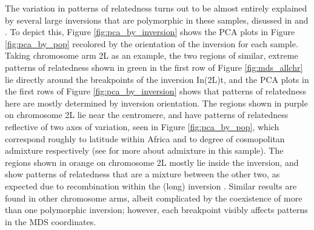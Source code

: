 \documentclass[11pt, oneside]{article}   	%
\begin{document}
The variation in patterns of relatedness turns out to be almost entirely explained by
several large inversions that are polymorphic in these samples, 
disussed in \citet{corbett2012population} and \citet{langley2012genomic}.
To depict this, Figure \ref{fig:pca_by_inversion} shows
the PCA plots in Figure \ref{fig:pca_by_pop} recolored by the orientation of the inversion for each sample.
Taking chromosome arm 2L as an example,
the two regions of similar, extreme patterns of relatedness
shown in green in the first row of Figure \ref{fig:mds_allchr}
lie directly around the breakpoints of the inversion In(2L)t,
and the PCA plots in the first rows of Figure \ref{fig:pca_by_inversion}
shows that patterns of relatedness here are mostly determined by inversion orientation.
The regions shown in purple on chromosome 2L lie near the centromere,
and have patterns of relatedness reflective of two axes of variation,
seen in Figure \ref{fig:pca_by_pop},
which correspond roughly to latitude within Africa and to degree of cosmopolitan admixture respectively
(see \citet{lack2015drosophila} for more about admixture in this sample).
The regions shown in orange on chromosome 2L mostly lie inside the inversion,
and show patterns of relatedness that are a mixture between the other two,
as expected due to recombination within the (long) inversion \citep{guerrero2011coalescent}.
Similar results are found in other chromosome arms,
albeit complicated by the coexistence of more than one polymorphic inversion;
however, each breakpoint visibly affects patterns in the MDS coordinates.
\end{document}
